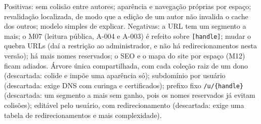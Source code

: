 {Positivas:  sem colisão entre autores; aparência e navegação próprias por espaço; revalidação localizada, de modo que a edição de um autor não invalida o cache dos outros; modelo simples de explicar. Negativas: a URL tem um segmento a mais; o M07 (leitura pública, A-004 e A-003) é refeito sobre \texttt{[handle]}; mudar o  quebra URLs (daí a restrição ao administrador, e não há redirecionamentos nesta versão); há mais nomes reservados; o SEO e o mapa do site por espaço (M12) ficam adiados.}
{Árvore única compartilhada, com cada coleção raiz de um dono (descartada: colide  e impõe uma aparência só); subdomínio por usuário (descartada: exige DNS com curinga e certificados); prefixo fixo \texttt{/u/\{handle\}} (descartada: um segmento a mais sem ganho, pois os nomes reservados já evitam colisões);  editável pelo usuário, com redirecionamento (descartada: exige uma tabela de redirecionamentos e mais complexidade).}


